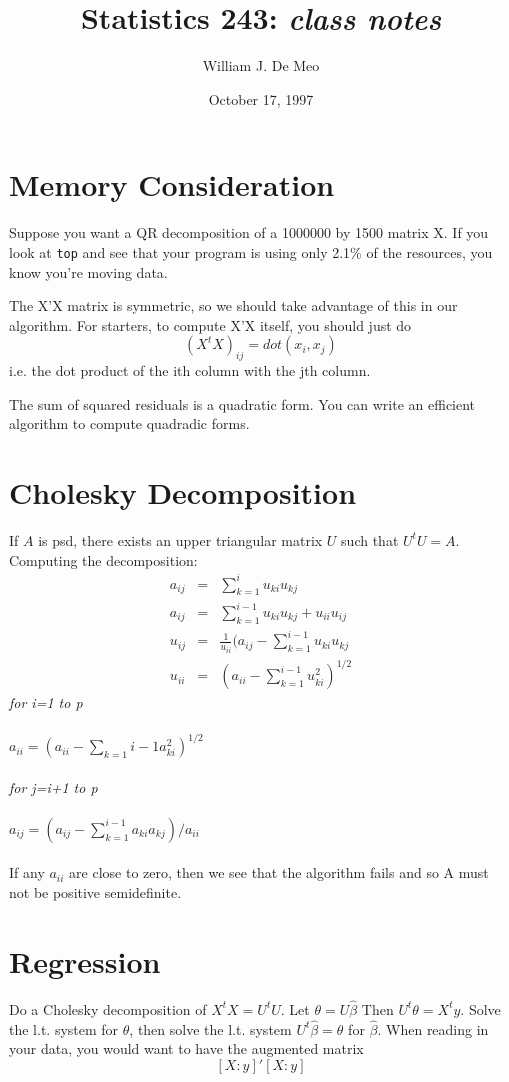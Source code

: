 \documentclass{article}
\begin{document}
\title{Statistics 243: \emph{class notes}}
\author{William J. De Meo}
\date{October 17, 1997 }
\maketitle
\section{Memory Consideration}
Suppose you want a QR decomposition of a 1000000 by 1500
matrix X.  If you look at {\tt top} and see that your 
program is using only 2.1\% of the resources, you know you're
moving data.

The X'X matrix is symmetric, so we should take advantage of this
in our algorithm.  For starters, to compute X'X itself, you
should just do 
\[(X^tX)_{ij} = dot(x_i, x_j)\]
i.e. the dot product of the ith column with the jth column.

The sum of squared residuals is a quadratic form.
You can write an efficient algorithm to compute quadradic forms.

\section{Cholesky Decomposition}
If $A$ is psd, there exists an upper triangular matrix $U$ such that 
$U^tU = A$.
Computing the decomposition:
\begin{eqnarray*}
a_{ij}& =& \sum_{k=1}^i u_{ki}u_{kj}\\
a_{ij}& =& \sum_{k=1}^{i-1}u_{ki}u_{kj} + u_{ii}u_{ij}\\
u_{ij}& =& \frac{1}{u_{ii}}(a_{ij} - \sum_{k=1}^{i-1}u_{ki}u_{kj}\\
u_{ii}& =& (a_{ii} - \sum_{k=1}^{i-1}u_{ki}^2)^{1/2}
\end{eqnarray*}
\emph{for i=1 to p}\\\\
$a_{ii} = (a_{ii} - \sum_{k=1}{i-1}a_{ki}^2)^{1/2}$\\\\
\emph{for j=i+1 to p}\\\\
$a_{ij} = (a_{ij} - \sum_{k=1}^{i-1}a_{ki}a_{kj})/a_{ii}$\\\\
If any $a_{ii}$ are close to zero, then we see that the algorithm
fails and so A must not be positive semidefinite.

\section{Regression}
Do a Cholesky decomposition of $X^tX = U^tU$.  Let $\theta = U\hat\beta$
Then $U^t\theta = X^ty$.  Solve the l.t. system for $\theta$, then
solve the l.t. system $U^t\hat \beta = \theta$ for $\hat \beta$.
When reading in your data, you would want
to have the augmented matrix
\[
[X:y]'[X:y] \]
\end{document}
